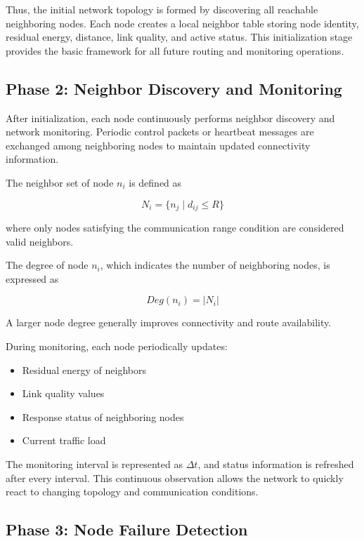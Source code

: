 \documentclass[a4paper,fleqn]{cas-dc}
\numberwithin{equation}{section}
\begin{document}
Thus, the initial network topology is formed by discovering all reachable neighboring nodes. Each node creates a local neighbor table storing node identity, residual energy, distance, link quality, and active status. This initialization stage provides the basic framework for all future routing and monitoring operations.

\subsection{Phase 2: Neighbor Discovery and Monitoring}

After initialization, each node continuously performs neighbor discovery and network monitoring. Periodic control packets or heartbeat messages are exchanged among neighboring nodes to maintain updated connectivity information.

The neighbor set of node $n_i$ is defined as

\begin{equation}
\label{eq:neighbor}
N_i=\{n_j \mid d_{ij}\leq R\}
\end{equation}

where only nodes satisfying the communication range condition are considered valid neighbors.

The degree of node $n_i$, which indicates the number of neighboring nodes, is expressed as

\begin{equation}
Deg(n_i)=|N_i|
\end{equation}

A larger node degree generally improves connectivity and route availability.

During monitoring, each node periodically updates:

\begin{itemize}
\item Residual energy of neighbors
\item Link quality values
\item Response status of neighboring nodes
\item Current traffic load
\end{itemize}

The monitoring interval is represented as $\Delta t$, and status information is refreshed after every interval. This continuous observation allows the network to quickly react to changing topology and communication conditions.

\subsection{Phase 3: Node Failure Detection}
\end{document}
